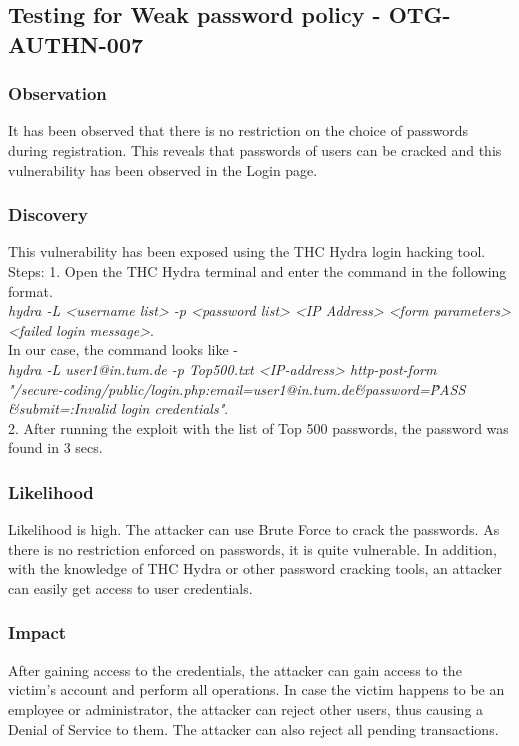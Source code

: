 \subsection{Testing for Weak password policy - OTG-AUTHN-007} \label{OTG-AUTHN-007}

\subsubsection{Observation}
It has been observed that there is no restriction on the choice of passwords during registration. This reveals that passwords of users can be cracked and this vulnerability has been observed in the Login page.

\subsubsection{Discovery}
This vulnerability has been exposed using the THC Hydra login hacking tool. \\
Steps: 
1. Open the THC Hydra terminal and enter the command in the following format. \\
\textit{hydra -L <username list> -p <password list> <IP Address> <form parameters><failed login message>}. \\
In our case, the command looks like - \\
\textit{hydra -L user1@in.tum.de -p Top500.txt <IP-address> http-post-form \\ "/secure-coding/public/login.php:email=user1@in.tum.de\&password=\^PASS\^ \\ \&submit=:Invalid login credentials"}. \\
2. After running the exploit with the list of Top 500 passwords, the password was found in 3 secs.

\subsubsection{Likelihood}
Likelihood is high.
The attacker can use Brute Force to crack the passwords. As there is no restriction enforced on passwords, it is quite vulnerable. In addition, with the knowledge of THC Hydra or other password cracking tools, an attacker can easily get access to user credentials. 

\subsubsection{Impact}
After gaining access to the credentials, the attacker can gain access to the victim's account and perform all operations. In case the victim happens to be an employee or administrator, the attacker can reject other users, thus causing a Denial of Service to them. The attacker can also reject all pending transactions. 

